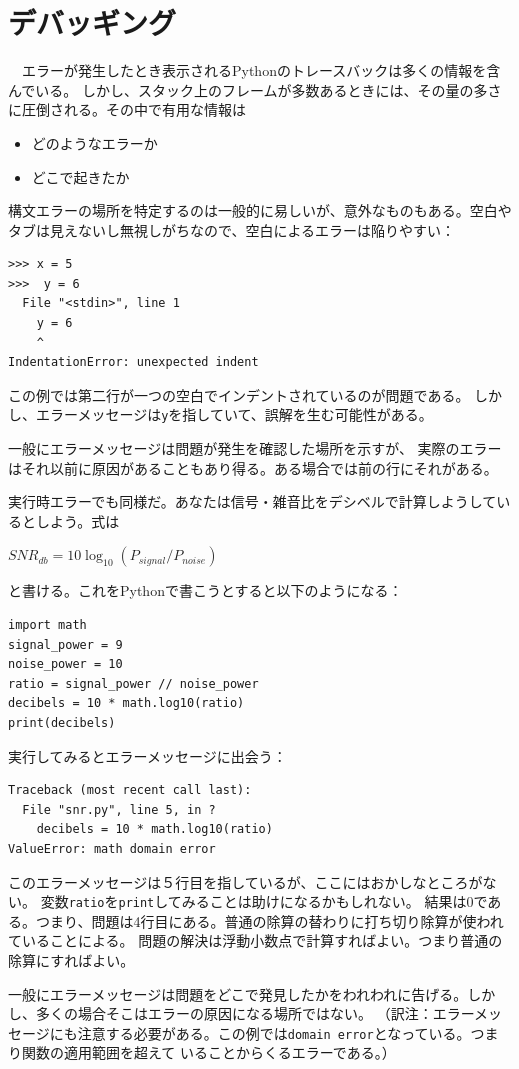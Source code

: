 \documentclass[a4j,12pt,makeidx]{jbook}
\begin{document}
\section{デバッギング}
　エラーが発生したとき表示されるPythonのトレースバックは多くの情報を含んでいる。
しかし、スタック上のフレームが多数あるときには、その量の多さに圧倒される。その中で有用な情報は
\begin{itemize}
\item どのようなエラーか
\item どこで起きたか
\end{itemize}
構文エラーの場所を特定するのは一般的に易しいが、意外なものもある。空白やタブは見えないし無視しがちなので、空白によるエラーは陥りやすい：
\begin{verbatim}
>>> x = 5
>>>  y = 6
  File "<stdin>", line 1
    y = 6
    ^
IndentationError: unexpected indent
\end{verbatim}
この例では第二行が一つの空白でインデントされているのが問題である。
しかし、エラーメッセージは{\tt y}を指していて、誤解を生む可能性がある。\par
一般にエラーメッセージは問題が発生を確認した場所を示すが、
実際のエラーはそれ以前に原因があることもあり得る。ある場合では前の行にそれがある。\par
実行時エラーでも同様だ。あなたは信号・雑音比をデシベルで計算しようしているとしよう。式は \par
  $SNR_{db} = 10 \log_{10} (P_{signal} / P_{noise})$ \par
と書ける。これをPythonで書こうとすると以下のようになる：
\begin{verbatim}
import math
signal_power = 9
noise_power = 10
ratio = signal_power // noise_power
decibels = 10 * math.log10(ratio)
print(decibels)
\end{verbatim}
実行してみるとエラーメッセージに出会う：
\begin{verbatim}
Traceback (most recent call last):
  File "snr.py", line 5, in ?
    decibels = 10 * math.log10(ratio)
ValueError: math domain error
\end{verbatim}
このエラーメッセージは５行目を指しているが、ここにはおかしなところがない。
変数{\tt ratio}を{\tt print}してみることは助けになるかもしれない。
結果は{\tt }0である。つまり、問題は4行目にある。普通の除算の替わりに打ち切り除算が使われていることによる。
問題の解決は浮動小数点で計算すればよい。つまり普通の除算にすればよい。\par
一般にエラーメッセージは問題をどこで発見したかをわれわれに告げる。しかし、多くの場合そこはエラーの原因になる場所ではない。
（訳注：エラーメッセージにも注意する必要がある。この例では{\tt domain error}となっている。つまり関数の適用範囲を超えて
いることからくるエラーである。）　
%
\end{document}
